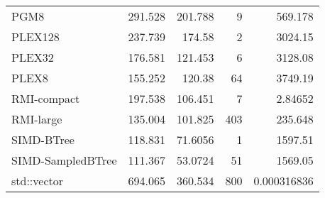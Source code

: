 \begin{tabular}{lrrrr}
 PGM8              &                291.528 &              201.788  &            9 &    569.178       \\
 PLEX128           &                237.739 &              174.58   &            2 &   3024.15        \\
 PLEX32            &                176.581 &              121.453  &            6 &   3128.08        \\
 PLEX8             &                155.252 &              120.38   &           64 &   3749.19        \\
 RMI-compact       &                197.538 &              106.451  &            7 &      2.84652     \\
 RMI-large         &                135.004 &              101.825  &          403 &    235.648       \\
 SIMD-BTree        &                118.831 &               71.6056 &            1 &   1597.51        \\
 SIMD-SampledBTree &                111.367 &               53.0724 &           51 &   1569.05        \\
 std::vector       &                694.065 &              360.534  &          800 &      0.000316836 \\
\hline
\end{tabular}